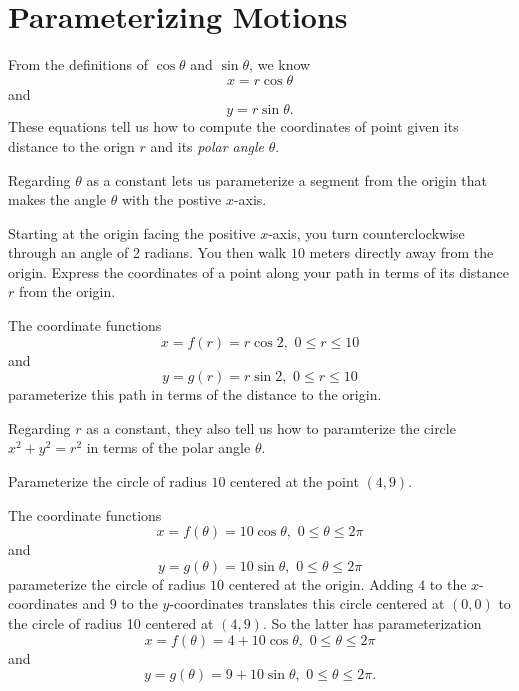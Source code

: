 \documentclass{ximera}
\begin{document}
\section{Parameterizing Motions}
From the definitions of $\cos\theta$ and $\sin \theta$, we know
\[
    x = r \cos \theta 
\]
and
\[
      y=r\sin \theta .
\]
These equations tell us how to compute the coordinates of point given its distance to the orign $r$ and its \emph{polar angle} $\theta$.

Regarding $\theta$ as a constant lets us parameterize a segment from the origin that makes the angle $\theta$ with the postive $x$-axis.

\begin{example} \label{Ex11:Cosine}
Starting at the origin facing the positive $x$-axis, you turn counterclockwise through an angle of 2 radians. You then walk $10$ meters directly away from the origin. Express the coordinates of a point along your path in terms of its distance $r$ from the origin.

\begin{explanation}
The coordinate functions
\[
     x = f(r) = r\cos 2  , \,\,   0\leq r \leq 10
\]
and
\[
  y =g(r) = r \sin 2  , \,\,   0\leq r \leq 10
\]
parameterize this path in terms of the distance to the origin.
\end{explanation}
\end{example}



Regarding $r$ as a constant, they also tell us how to paramterize the circle $x^2 + y^2 = r^2$ in terms of the polar angle $\theta$.

\begin{example} \label{Ex10:Cosine}
Parameterize the circle of radius $10$ centered at the point $(4,9)$.

\begin{explanation}
The coordinate functions
\[
     x = f(\theta) = 10\cos \theta  , \, \,   0\leq \theta \leq 2\pi
\]
and
\[
  y =g(\theta) = 10\sin \theta   , \,\, 0\leq \theta \leq 2\pi
\]
parameterize the circle of radius $10$ centered at the origin. Adding $4$ to the $x$-coordinates and $9$ to the $y$-coordinates translates this circle centered at $(0,0)$ to the circle of radius 10 centered at $(4,9)$. So the latter has parameterization
\[
     x = f(\theta) = 4+ 10\cos \theta ,  \,\,  0\leq \theta \leq 2\pi
\]
and
\[
  y = g(\theta) = 9 + 10\sin \theta  , \,\,   0\leq \theta \leq 2\pi .
\]
\end{explanation}
\end{example}
\end{document}

